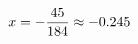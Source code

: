 \documentclass[preview]{standalone}
\begin{document}
\begin{align*}
\special{dvisvgm:raw <g id='unique000'>}x = - \frac{45}{184} \approx -0.245\special{dvisvgm:raw </g>}
\end{align*}
\end{document}
